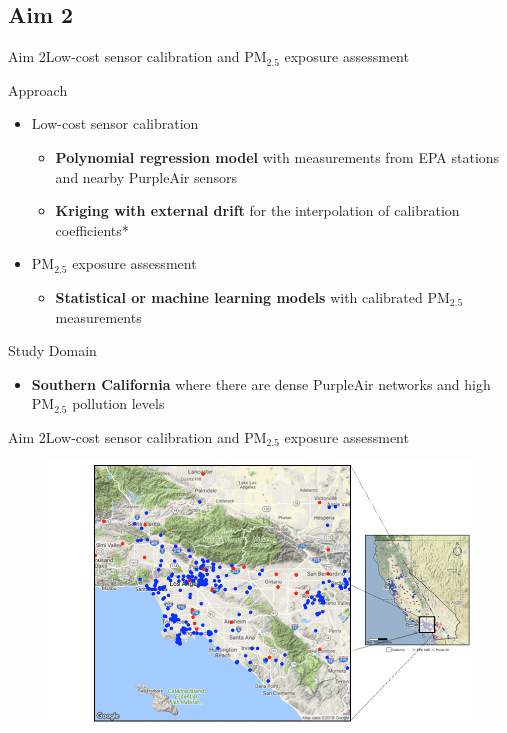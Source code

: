 \documentclass{beamer}
\begin{document}
\subsection{Aim 2}
\begin{frame}{Aim 2}{Low-cost sensor calibration and PM$_{2.5}$ exposure assessment}
    \begin{block}{Approach}
        \begin{itemize}
            \item Low-cost sensor calibration
                \begin{itemize}
                    \item \textbf{Polynomial regression model} with measurements from EPA stations and nearby PurpleAir sensors
                    \item \textbf{Kriging with external drift} for the interpolation of calibration coefficients*
                \end{itemize}
            \pause
            \item PM$_{2.5}$ exposure assessment
                \begin{itemize}
                    \item \textbf{Statistical or machine learning models} with calibrated PM$_{2.5}$ measurements
                \end{itemize}
        \end{itemize}
    \end{block}
    \pause
    \begin{block}{Study Domain}
        \begin{itemize}
            \item \textbf{Southern California} where there are dense PurpleAir networks and high PM$_{2.5}$ pollution levels
        \end{itemize}
        
    \end{block}
\end{frame}

\begin{frame}{Aim 2}{Low-cost sensor calibration and PM$_{2.5}$ exposure assessment}
    \begin{figure}
        \centering
        \includegraphics[height=0.55\textwidth]{img/socal.jpg}
        \label{fig:aim2}
    \end{figure}
\end{frame}
\end{document}
